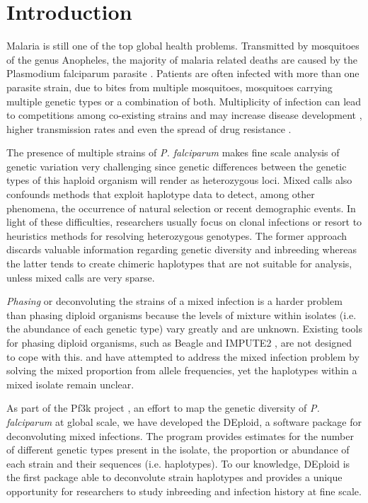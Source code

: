 \documentclass{bioinfo}
\begin{document}
\maketitle

\section{Introduction}
Malaria is still one of the top global health problems. Transmitted by mosquitoes of the genus Anopheles, the majority of malaria related deaths are caused by the  Plasmodium falciparum parasite \citep{WHO2016}. Patients are often infected with  more than one parasite strain, due to bites from multiple mosquitoes, mosquitoes carrying multiple genetic types or a combination of both. Multiplicity of infection  can lead to competitions among co-existing strains  and may increase  disease development \citep{deRoode2005}, higher transmission rates \citep{Arnot1998} and even the spread of drug resistance \citep{deRoode2004}.

The presence of multiple strains of {\it P. falciparum} makes fine scale analysis of genetic variation very challenging since genetic differences between the genetic types of this haploid organism will render as heterozygous loci. Mixed calls also confounds methods that exploit haplotype data to detect, among other phenomena, the occurrence of natural selection or recent demographic events. In light of these difficulties, researchers usually focus on clonal infections or resort to heuristics methods for resolving heterozygous genotypes. The former approach discards valuable information regarding genetic diversity and inbreeding whereas the latter tends to create chimeric haplotypes that are not suitable for analysis, unless mixed calls are very sparse.

{\it Phasing} or deconvoluting the strains of a mixed infection is a harder problem than phasing diploid organisms because the levels of mixture within isolates (i.e. the abundance of each genetic type) vary greatly and are unknown.  Existing tools for phasing diploid organisms, such as Beagle \citep{Browning2007} and IMPUTE2 \citep{Howie2009}, are not designed to cope with this. \citet{Galinsky2015} and \citet{Jack2016} have attempted to address the mixed infection problem by solving the mixed proportion from allele frequencies, yet the haplotypes within a mixed isolate remain unclear.


As part of the Pf3k project \citep{Pf3k2016}, an effort to map the genetic diversity of {\it P. falciparum} at global scale, we have developed the {\textmd DEploid}, a software package for deconvoluting  mixed infections. The program provides estimates for the number of different genetic types present in the isolate, the proportion or abundance of each strain and their sequences (i.e. haplotypes). To our knowledge, DEploid is the first package able to deconvolute strain haplotypes and provides a unique opportunity for researchers to study inbreeding and infection history at fine scale.
\end{document}
